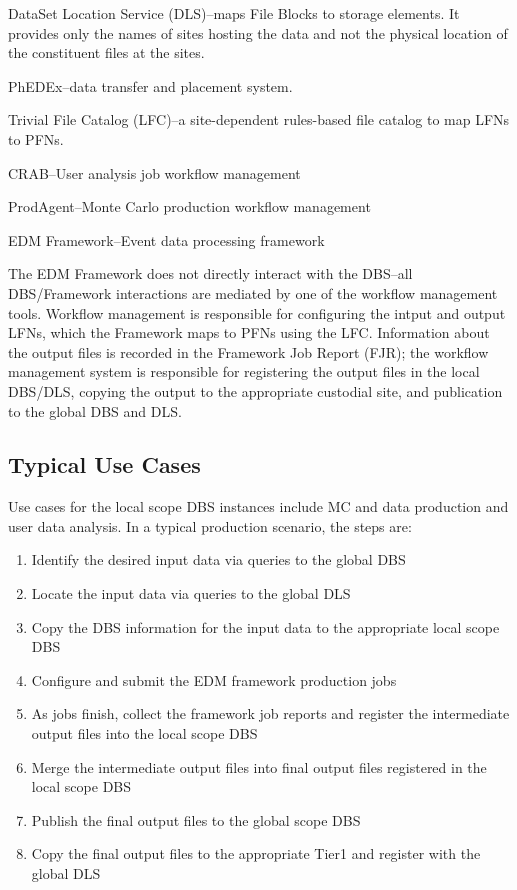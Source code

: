 \documentclass{cmspaper}
\begin{document}
\begin{description}
\item{DataSet Location Service (DLS)}--maps File Blocks to storage elements.
It provides only the  names of sites hosting the data and not the physical
location of the constituent files at the sites.
\item{PhEDEx}--data transfer and placement system.
\item{Trivial File Catalog (LFC)}--a site-dependent rules-based file catalog to map LFNs to PFNs.
\item{CRAB}--User analysis job workflow management
\item{ProdAgent}--Monte Carlo production workflow management
\item{EDM Framework}--Event data processing framework
\end{description}

The EDM Framework does not directly interact with the DBS--all
DBS/Framework interactions are mediated by one of the workflow
management tools.  Workflow management is responsible for
configuring the intput and output LFNs, which the Framework
maps to PFNs using the LFC.  Information about the output
files is recorded in the Framework Job Report (FJR); the
workflow management system is responsible for registering
the output files in the local DBS/DLS, copying the output to
the appropriate custodial site, and publication to the global
DBS and DLS.

\subsection{Typical Use Cases}

Use cases for the local scope DBS instances include MC and data
production and user data analysis.  In a typical
production scenario, the steps are:

\begin{enumerate}
\item Identify the desired input data via queries to the global DBS
\item Locate the input data via queries to the global DLS
\item Copy the DBS information for the input data to the appropriate
local scope DBS
\item Configure and submit the EDM framework production jobs
\item As jobs finish, collect the framework job reports and register
the intermediate output files into the local scope DBS
\item Merge the intermediate output files into final output files
registered in the local scope DBS
\item Publish the final output files to the global scope DBS
\item Copy the final output files to the appropriate Tier1 and
register with the global DLS
\end{enumerate}
\end{document}
